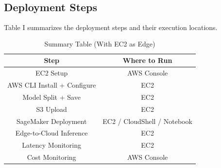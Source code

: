 \documentclass[conference]{IEEEtran}
\begin{document}
\subsection{Deployment Steps}
Table I summarizes the deployment steps and their execution locations.

\begin{table}[h]
  \caption{Summary Table (With EC2 as Edge)}
  \begin{center}
    \begin{tabular}{|c|c|}
      \hline
      \textbf{Step} & \textbf{Where to Run} \\
      \hline
      EC2 Setup & AWS Console \\
      AWS CLI Install + Configure & EC2 \\
      Model Split + Save & EC2 \\
      S3 Upload & EC2 \\
      SageMaker Deployment & EC2 / CloudShell / Notebook \\
      Edge-to-Cloud Inference & EC2 \\
      Latency Monitoring & EC2 \\
      Cost Monitoring & AWS Console \\
      \hline
    \end{tabular}
  \end{center}
  \label{tab:summary}
\end{table}
\end{document}
